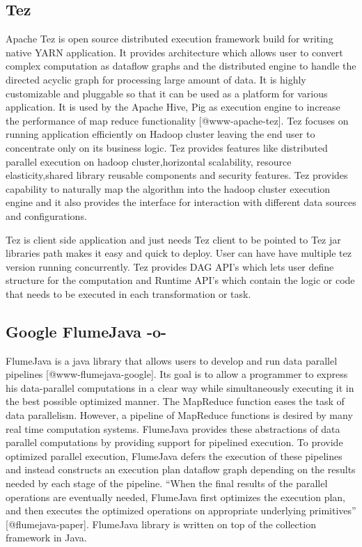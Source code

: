 \subsection{Tez}

Apache Tez is open source distributed execution framework build for
writing native YARN application. It provides architecture which allows
user to convert complex computation as dataflow graphs and the
distributed engine to handle the directed acyclic graph for processing
large amount of data. It is highly customizable and pluggable so that
it can be used as a platform for various application. It is used by
the Apache Hive, Pig as execution engine to increase the performance
of map reduce functionality [@www-apache-tez]. Tez focuses on
running application efficiently on Hadoop cluster leaving the end user
to concentrate only on its business logic. Tez provides features like
distributed parallel execution on hadoop cluster,horizontal
scalability, resource elasticity,shared library reusable components
and security features. Tez provides capability to naturally map the
algorithm into the hadoop cluster execution engine and it also
provides the interface for interaction with different data sources and
configurations.
  
Tez is client side application and just needs Tez client to be pointed
to Tez jar libraries path makes it easy and quick to deploy. User can
have have multiple tez version running concurrently. Tez provides DAG
API's which lets user define structure for the computation and Runtime
API's which contain the logic or code that needs to be executed in
each transformation or task.

\subsection{Google FlumeJava -o-}

FlumeJava is a java library that allows users to develop and run data
parallel pipelines [@www-flumejava-google]. Its goal is to allow a
programmer to express his data-parallel computations in a clear way
while simultaneously executing it in the best possible optimized
manner. The MapReduce function eases the task of data
parallelism. However, a pipeline of MapReduce functions is desired by
many real time computation systems. FlumeJava provides these
abstractions of data parallel computations by providing support for
pipelined execution. To provide optimized parallel execution,
FlumeJava defers the execution of these pipelines and instead
constructs an execution plan dataflow graph depending on the results
needed by each stage of the pipeline. ``When the final results of the
parallel operations are eventually needed, FlumeJava first optimizes
the execution plan, and then executes the optimized operations on
appropriate underlying primitives'' [@flumejava-paper]. FlumeJava
library is written on top of the collection framework in Java.

